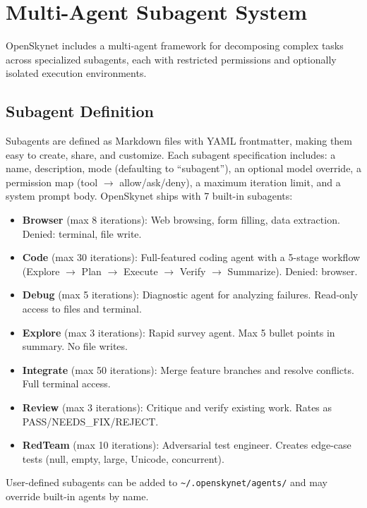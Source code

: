 \section{Multi-Agent Subagent System}
\label{sec:subagents}

OpenSkynet includes a multi-agent framework for decomposing complex tasks across specialized subagents, each with restricted permissions and optionally isolated execution environments.

\subsection{Subagent Definition}

Subagents are defined as Markdown files with YAML frontmatter, making them easy to create, share, and customize. Each subagent specification includes: a name, description, mode (defaulting to ``subagent''), an optional model override, a permission map (tool $\rightarrow$ allow/ask/deny), a maximum iteration limit, and a system prompt body. OpenSkynet ships with 7 built-in subagents:

\begin{itemize}[leftmargin=*,itemsep=1pt]
    \item \textbf{Browser} (max 8 iterations): Web browsing, form filling, data extraction. Denied: terminal, file write.
    \item \textbf{Code} (max 30 iterations): Full-featured coding agent with a 5-stage workflow (Explore $\rightarrow$ Plan $\rightarrow$ Execute $\rightarrow$ Verify $\rightarrow$ Summarize). Denied: browser.
    \item \textbf{Debug} (max 5 iterations): Diagnostic agent for analyzing failures. Read-only access to files and terminal.
    \item \textbf{Explore} (max 3 iterations): Rapid survey agent. Max 5 bullet points in summary. No file writes.
    \item \textbf{Integrate} (max 50 iterations): Merge feature branches and resolve conflicts. Full terminal access.
    \item \textbf{Review} (max 3 iterations): Critique and verify existing work. Rates as PASS/NEEDS\_FIX/REJECT.
    \item \textbf{RedTeam} (max 10 iterations): Adversarial test engineer. Creates edge-case tests (null, empty, large, Unicode, concurrent).
\end{itemize}

User-defined subagents can be added to \texttt{\textasciitilde/.openskynet/agents/} and may override built-in agents by name.

